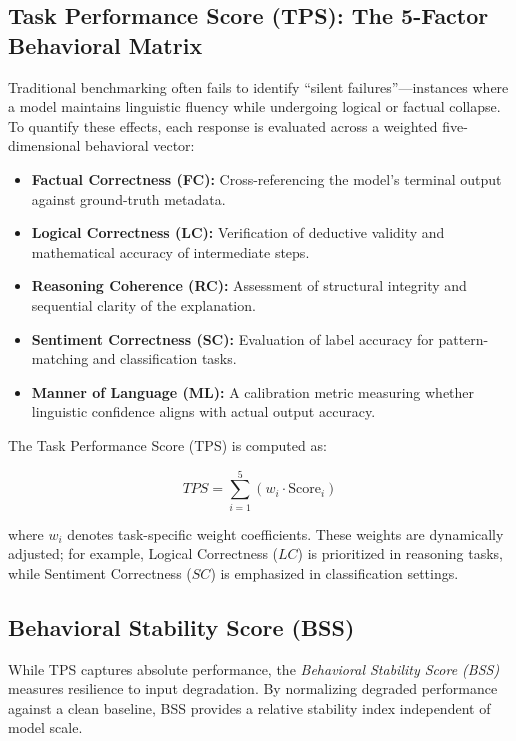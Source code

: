 \documentclass[conference]{IEEEtran}
\begin{document}
\subsection{Task Performance Score (TPS): The 5-Factor Behavioral Matrix}

Traditional benchmarking often fails to identify ``silent failures''—instances where a model maintains linguistic fluency while undergoing logical or factual collapse. To quantify these effects, each response is evaluated across a weighted five-dimensional behavioral vector:

\begin{itemize}
\item \textbf{Factual Correctness (FC):} Cross-referencing the model’s terminal output against ground-truth metadata.
\item \textbf{Logical Correctness (LC):} Verification of deductive validity and mathematical accuracy of intermediate steps.
\item \textbf{Reasoning Coherence (RC):} Assessment of structural integrity and sequential clarity of the explanation.
\item \textbf{Sentiment Correctness (SC):} Evaluation of label accuracy for pattern-matching and classification tasks.
\item \textbf{Manner of Language (ML):} A calibration metric measuring whether linguistic confidence aligns with actual output accuracy.
\end{itemize}

The Task Performance Score (TPS) is computed as:

\begin{equation}
TPS = \sum_{i=1}^{5} \left( w_i \cdot \text{Score}_i \right)
\end{equation}

where $w_i$ denotes task-specific weight coefficients. These weights are dynamically adjusted; for example, Logical Correctness ($LC$) is prioritized in reasoning tasks, while Sentiment Correctness ($SC$) is emphasized in classification settings.

\subsection{Behavioral Stability Score (BSS)}

While TPS captures absolute performance, the \textit{Behavioral Stability Score (BSS)} measures resilience to input degradation. By normalizing degraded performance against a clean baseline, BSS provides a relative stability index independent of model scale.
\end{document}
